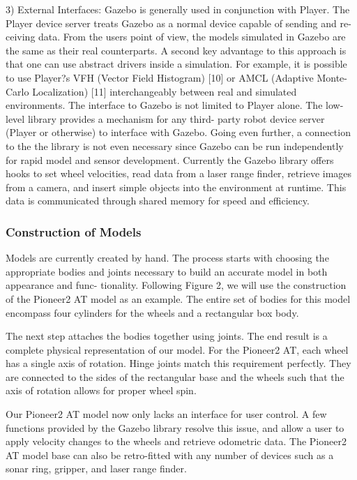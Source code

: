 3) External Interfaces: Gazebo is generally used in conjunction with Player. The Player device server treats Gazebo as a normal device capable of sending and re-ceiving data. From the users point of view, the models simulated in Gazebo are the same as their real counterparts. A second key advantage to this approach is that one can use abstract drivers inside a simulation. For example, it is possible to use Player?s VFH (Vector Field Histogram) [10] or AMCL (Adaptive Monte-Carlo Localization) [11] interchangeably between real and simulated environments.
The interface to Gazebo is not limited to Player alone. The low-level library provides a mechanism for any third- party robot device server (Player or otherwise) to interface with Gazebo. Going even further, a connection to the the library is not even necessary since Gazebo can be run independently for rapid model and sensor development.
Currently the Gazebo library offers hooks to set wheel velocities, read data from a laser range finder, retrieve images from a camera, and insert simple objects into the environment at runtime. This data is communicated through shared memory for speed and efficiency.

\subsubsection{Construction of Models}

Models are currently created by hand. The process starts with choosing the appropriate bodies and joints necessary to build an accurate model in both appearance and func- tionality. Following Figure 2, we will use the construction of the Pioneer2 AT model as an example. The entire set of bodies for this model encompass four cylinders for the wheels and a rectangular box body.

The next step attaches the bodies together using joints. The end result is a complete physical representation of our model. For the Pioneer2 AT, each wheel has a single axis of rotation. Hinge joints match this requirement perfectly. They are connected to the sides of the rectangular base and the wheels such that the axis of rotation allows for proper wheel spin.

Our Pioneer2 AT model now only lacks an interface for user control. A few functions provided by the Gazebo library resolve this issue, and allow a user to apply velocity changes to the wheels and retrieve odometric data. The Pioneer2 AT model base can also be retro-fitted with any number of devices such as a sonar ring, gripper, and laser range finder.

